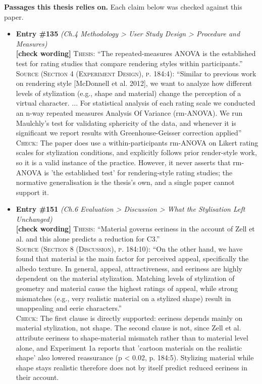 \documentclass[11pt, a4paper]{article}
\begin{document}
\textbf{Passages this thesis relies on.} Each claim below was checked against this paper.
\begin{itemize}[leftmargin=1.2em,itemsep=4pt]
\item \textbf{Entry \#135} \textit{(Ch.4 Methodology > User Study Design > Procedure and Measures)}\\
\textcolor{partialorange}{\textbf{[check wording]}} \textsc{Thesis:} ``The repeated-measures ANOVA is the established test for rating studies that compare rendering styles within participants.''\\
\textsc{Source (Section 4 (Experiment Design), p. 184:4):} ``Similar to previous work on rendering style [McDonnell et al. 2012], we want to analyze how different levels of stylization (e.g., shape and material) change the perception of a virtual character. ... For statistical analysis of each rating scale we conducted an n-way repeated measures Analysis Of Variance (rm-ANOVA). We run Maulchly's test for validating sphericity of the data, and whenever it is significant we report results with Greenhouse-Geisser correction applied''\\
\textsc{Check:} The paper does use a within-participants rm-ANOVA on Likert rating scales for stylization conditions, and explicitly follows prior render-style work, so it is a valid instance of the practice. However, it never asserts that rm-ANOVA is 'the established test' for rendering-style rating studies; the normative generalisation is the thesis's own, and a single paper cannot support it.
\item \textbf{Entry \#151} \textit{(Ch.6 Evaluation > Discussion > What the Stylisation Left Unchanged)}\\
\textcolor{partialorange}{\textbf{[check wording]}} \textsc{Thesis:} ``Material governs eeriness in the account of Zell et al. and this alone predicts a reduction for C3.''\\
\textsc{Source (Section 8 (Discussion), p. 184:10):} ``On the other hand, we have found that material is the main factor for perceived appeal, specifically the albedo texture. In general, appeal, attractiveness, and eeriness are highly dependent on the material stylization. Matching levels of stylization of geometry and material cause the highest ratings of appeal, while strong mismatches (e.g., very realistic material on a stylized shape) result in unappealing and eerie characters.''\\
\textsc{Check:} The first clause is directly supported: eeriness depends mainly on material stylization, not shape. The second clause is not, since Zell et al. attribute eeriness to shape-material mismatch rather than to material level alone, and Experiment 1a reports that 'cartoon materials on the realistic shape' also lowered reassurance (p < 0.02, p. 184:5). Stylizing material while shape stays realistic therefore does not by itself predict reduced eeriness in their account.
\end{itemize}
\end{document}
